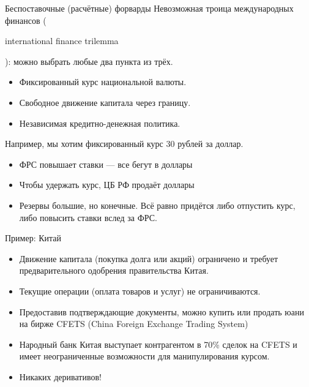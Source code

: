 \documentclass{beamer}
\newcommand{\en}[1]{\begin{otherlanguage}{english}#1\end{otherlanguage}}
\begin{document}
\begin{frame}{Беспоставочные (расчётные) форварды}
\justify
Невозможная троица международных финансов (\en{international finance trilemma}): можно выбрать любые \alert{два} пункта из трёх.
\begin{itemize}
\item Фиксированный курс национальной валюты.
\item Свободное движение капитала через границу.
\item Независимая кредитно-денежная политика.
\end{itemize}

\justify
Например, мы хотим фиксированный курс 30 рублей за доллар.
\begin{itemize}
\justifying
\item ФРС повышает ставки --- все бегут в доллары
\item Чтобы удержать курс, ЦБ РФ продаёт доллары
\item Резервы большие, но конечные. Всё равно придётся либо отпустить курс, либо повысить ставки вслед за ФРС.
\end{itemize}
\end{frame}



\begin{frame}{Пример: Китай}
\begin{itemize}
\justifying
\item Движение капитала (покупка долга или акций) ограничено и требует предварительного одобрения правительства Китая.

\item Текущие операции (оплата товаров и услуг) не ограничиваются. 

\item Предоставив подтверждающие документы, можно купить или продать юани на бирже CFETS (China Foreign Exchange Trading System)

\item Народный банк Китая выступает контрагентом в 70\% сделок на CFETS и имеет неограниченные возможности для манипулирования курсом.

\item \alert{Никаких деривативов!}
\end{itemize}
\end{frame}
\end{document}
